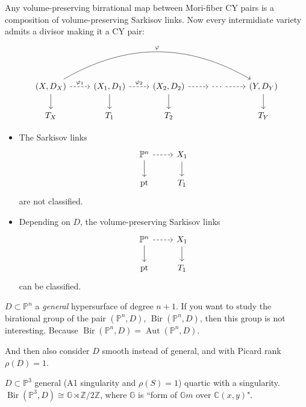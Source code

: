 \begin{thm}\leavevmode
Any volume-preserving birrational map between Mori-fiber CY pairs is a composition of volume-preserving Sarkisov links. Now every intermidiate variety admits a divisor making it a CY pair:
	\[\begin{tikzcd}
		(X,D_X)\arrow[r,dashed,"\varphi_1"]\arrow[d]\arrow[rrrr,bend left,"\varphi"]&(X_1,D_1)\arrow[r,dashed,"\varphi_2"]\arrow[d]&(X_2,D_2)\arrow[r,dashed]\arrow[d]&\cdots \arrow[r,dashed]&(Y,D_Y)\arrow[d]\\
	T_X	&T_1&T_2&&T_Y
	\end{tikzcd}\]
\end{thm}

\begin{remark}\leavevmode
\begin{itemize}
\item The Sarkisov links
\[\begin{tikzcd}
	 \mathbb{P}^n\arrow[r, dashed]\arrow[d]&X_1\arrow[d]\\\operatorname{pt}&T_1
\end{tikzcd}\]
are not classified.

\item Depending on \(D\), the volume-preserving Sarkisov links
\[\begin{tikzcd}
	 \mathbb{P}^n\arrow[r, dashed]\arrow[d]&X_1\arrow[d]\\\operatorname{pt}&T_1
\end{tikzcd}\]
can be classified.
\end{itemize}
\end{remark}

\begin{thm}\leavevmode
\(D \subset \mathbb{P}^n\) a \textit{general} hypersurface of degree \(n+1\). If you want to study the birational group of the pair \((\mathbb{P}^n,D)\), \(\operatorname{Bir}(\mathbb{P}^n,D)\), then this group is not interesting. Because \(\operatorname{Bir}(\mathbb{P}^n,D)=\operatorname{Aut}(\mathbb{P}^n,D)\).

And then also consider \(D\) smooth instead of general, and with Picard rank \(\rho(D)=1\).
\end{thm}

\begin{thm}[A-C-M]\leavevmode
\(D \subset \mathbb{P}^3\) general (A1 singularity and \(\rho(S)=1\)) quartic with a singularity. \(\operatorname{Bir}(\mathbb{P}^3,D)\cong \mathbb{G} \rtimes \mathbb{Z}/2\mathbb{Z}\), where \(\mathbb{G}\) is ``form of \(\mathbb{G}m\) over \(\mathbb{C}(x,y)\)".
\end{thm}

